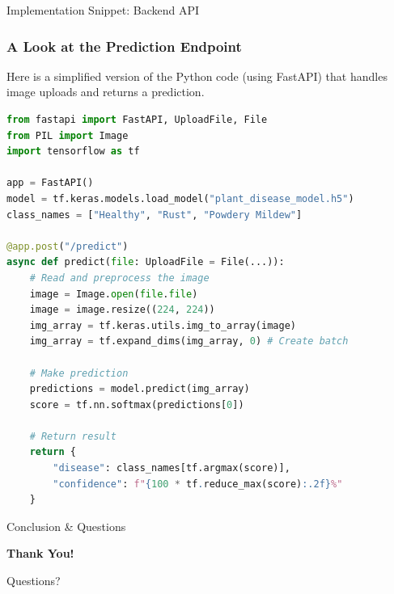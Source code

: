 \documentclass{beamer}
\begin{document}
\begin{frame}[fragile]{Implementation Snippet: Backend API}
    \frametitle{A Look at the Prediction Endpoint}
    
    Here is a simplified version of the Python code (using FastAPI) that handles image uploads and returns a prediction.
    
    \begin{lstlisting}[language=Python, caption={FastAPI Prediction Endpoint}]
from fastapi import FastAPI, UploadFile, File
from PIL import Image
import tensorflow as tf

app = FastAPI()
model = tf.keras.models.load_model("plant_disease_model.h5")
class_names = ["Healthy", "Rust", "Powdery Mildew"]

@app.post("/predict")
async def predict(file: UploadFile = File(...)):
    # Read and preprocess the image
    image = Image.open(file.file)
    image = image.resize((224, 224))
    img_array = tf.keras.utils.img_to_array(image)
    img_array = tf.expand_dims(img_array, 0) # Create batch

    # Make prediction
    predictions = model.predict(img_array)
    score = tf.nn.softmax(predictions[0])
    
    # Return result
    return {
        "disease": class_names[tf.argmax(score)],
        "confidence": f"{100 * tf.reduce_max(score):.2f}%"
    }
    \end{lstlisting}
\end{frame}


\begin{frame}{Conclusion \& Questions}
    \begin{center}
        \Huge\bfseries Thank You!
        \vspace{1cm}
        
        \Large Questions?
    \end{center}
\end{frame}
\end{document}
